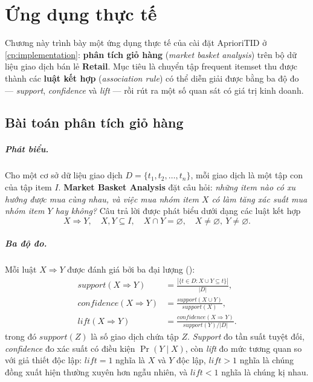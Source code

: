 \chapter[Ứng dụng thực tế]{Ứng dụng thực tế}
\label{cp:application}

Chương này trình bày một ứng dụng thực tế của cài đặt AprioriTID ở \autoref{cp:implementation}: \textbf{phân tích giỏ hàng} (\textit{market basket analysis}) trên bộ dữ liệu giao dịch bán lẻ \textbf{Retail}. Mục tiêu là chuyển tập frequent itemset thu được thành các \textbf{luật kết hợp} (\textit{association rule}) có thể diễn giải được bằng ba độ đo --- \textit{support}, \textit{confidence} và \textit{lift} --- rồi rút ra một số quan sát có giá trị kinh doanh.

\section{Bài toán phân tích giỏ hàng}
\label{sec:mba-problem}

\paragraph{Phát biểu.} Cho một cơ sở dữ liệu giao dịch $D = \{t_1, t_2, \dots, t_n\}$, mỗi giao dịch là một tập con của tập item $I$. \textbf{Market Basket Analysis} đặt câu hỏi: \emph{những item nào có xu hướng được mua cùng nhau, và việc mua nhóm item $X$ có làm tăng xác suất mua nhóm item $Y$ hay không?} Câu trả lời được phát biểu dưới dạng các luật kết hợp
\[
    X \Rightarrow Y, \quad X, Y \subseteq I, \quad X \cap Y = \varnothing, \quad X \neq \varnothing, \ Y \neq \varnothing.
\]

\paragraph{Ba độ đo.} Mỗi luật $X \Rightarrow Y$ được đánh giá bởi ba đại lượng (\cite{AgrawalSrikant1994}):
\begin{align}
    \textit{support}(X \Rightarrow Y)    &= \frac{|\{t \in D : X \cup Y \subseteq t\}|}{|D|}, \\
    \textit{confidence}(X \Rightarrow Y) &= \frac{\textit{support}(X \cup Y)}{\textit{support}(X)}, \\
    \textit{lift}(X \Rightarrow Y)       &= \frac{\textit{confidence}(X \Rightarrow Y)}{\textit{support}(Y) / |D|}.
\end{align}
trong đó $\textit{support}(Z)$ là số giao dịch chứa tập $Z$. \textit{Support} đo tần suất tuyệt đối, \textit{confidence} đo xác suất có điều kiện $\Pr(Y \mid X)$, còn \textit{lift} đo mức tương quan so với giả thiết độc lập: $\textit{lift} = 1$ nghĩa là $X$ và $Y$ độc lập, $\textit{lift} > 1$ nghĩa là chúng đồng xuất hiện thường xuyên hơn ngẫu nhiên, và $\textit{lift} < 1$ nghĩa là chúng kị nhau.

